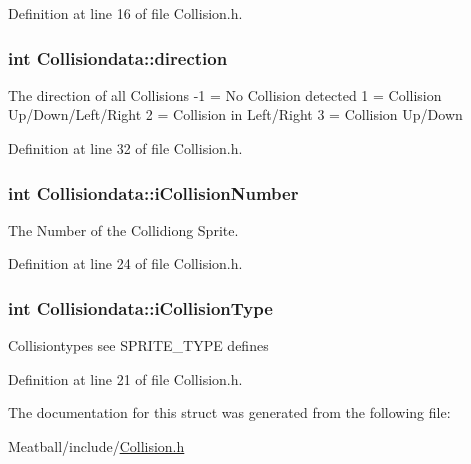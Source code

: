 Definition at line 16 of file Collision.\-h.

\hypertarget{struct_collisiondata_a9d98f1b596ad915987b73710ea9a55ff}{
\subsubsection[{direction}]{\setlength{\rightskip}{0pt plus 5cm}int Collisiondata\-::direction}}\label{struct_collisiondata_a9d98f1b596ad915987b73710ea9a55ff}
The direction of all Collisions -\/1 = No Collision detected 1 = Collision Up/\-Down/\-Left/\-Right 2 = Collision in Left/\-Right 3 = Collision Up/\-Down 

Definition at line 32 of file Collision.\-h.

\hypertarget{struct_collisiondata_ac5b2f3eb131fb4ba3dc8d2cfaed65006}{
\subsubsection[{i\-Collision\-Number}]{\setlength{\rightskip}{0pt plus 5cm}int Collisiondata\-::i\-Collision\-Number}}\label{struct_collisiondata_ac5b2f3eb131fb4ba3dc8d2cfaed65006}


The Number of the Collidiong Sprite. 



Definition at line 24 of file Collision.\-h.

\hypertarget{struct_collisiondata_a7b1299fc0c8589d2e4c3b64e29e9f722}{
\subsubsection[{i\-Collision\-Type}]{\setlength{\rightskip}{0pt plus 5cm}int Collisiondata\-::i\-Collision\-Type}}\label{struct_collisiondata_a7b1299fc0c8589d2e4c3b64e29e9f722}
Collisiontypes see S\-P\-R\-I\-T\-E\-\_\-\-T\-Y\-P\-E defines 

Definition at line 21 of file Collision.\-h.



The documentation for this struct was generated from the following file\-:\begin{DoxyCompactItemize}
\item 
Meatball/include/\hyperlink{_collision_8h}{Collision.\-h}\end{DoxyCompactItemize}
